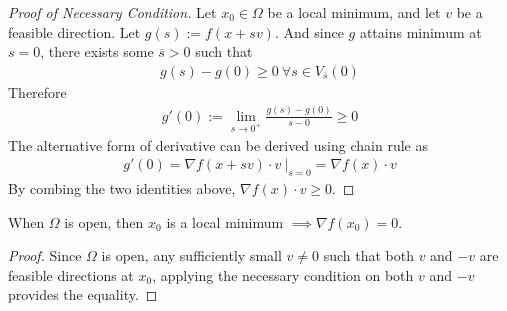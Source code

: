 \documentclass{article}
\begin{document}
   	\begin{proof}[Proof of Necessary Condition]
   		Let $x_0 \in \Omega$ be a local minimum, and let $v$ be a feasible direction.
   		Let $g(s) := f(x + sv)$. And since $g$ attains minimum at $s=0$, there exists some $\overline{s} > 0$ such that 
   		\begin{align}
   			g(s) - g(0) \geq 0\ \forall s \in V_{\overline{s}}(0)
   		\end{align}
   		Therefore
   		\begin{align}
   			g'(0) := \lim_{s \to 0^+} \frac{g(s) - g(0)}{s - 0} \geq 0
   		\end{align}
   		The alternative form of derivative can be derived using chain rule as
   		\begin{align}
   			g'(0) = \nabla f(x + sv) \cdot v\ |_{s=0} = \nabla f(x) \cdot v
   		\end{align}
   		By combing the two identities above, $\nabla f(x) \cdot v \geq 0$.
   	\end{proof}
   	
   	
   	\begin{corollary}
   		When $\Omega$ is open, then $x_0$ is a local minimum $\implies \nabla f(x_0) = 0$.
   	\end{corollary}
   	\begin{proof}
   		Since $\Omega$ is open, any sufficiently small $v \neq 0$ such that both $v$ and $-v$ are feasible directions at $x_0$, applying the necessary condition on both $v$ and $-v$ provides the equality.
   	\end{proof}
   	
%   	
   	
\end{document}
